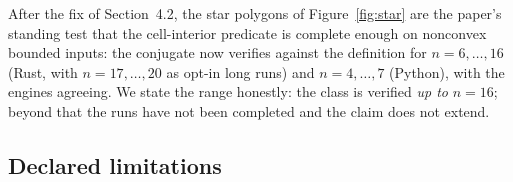 \documentclass[11pt]{article}
\theoremstyle{definition}
\begin{document}
After the fix of Section~4.2, the star polygons of Figure~\ref{fig:star} are
the paper's standing test that the cell-interior predicate is complete enough
on nonconvex bounded inputs: the conjugate now verifies against the definition
for $n=6,\ldots,16$ (Rust, with $n=17,\ldots,20$ as opt-in long runs) and
$n=4,\ldots,7$ (Python), with the engines agreeing.
 We state the range honestly: the class is
verified \emph{up to} $n=16$; beyond that the runs have not been completed and
the claim does not extend.

\subsection{Declared limitations}
\end{document}
